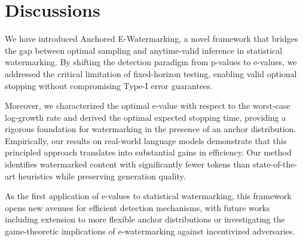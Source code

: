 \section{Discussions}

We have introduced Anchored E-Watermarking, a novel framework that bridges the gap between optimal sampling and anytime-valid inference in statistical watermarking. By shifting the detection paradigm from p-values to e-values, we addressed the critical limitation of fixed-horizon testing, enabling valid optional stopping without compromising Type-I error guarantees.

Moreover, we characterized the optimal e-value with respect to the worst-case log-growth rate and derived the optimal expected stopping time, providing a rigorous foundation for watermarking in the presence of an anchor distribution. Empirically, our results on real-world language models demonstrate that this principled approach translates into substantial gains in efficiency. Our method identifies watermarked content with significantly fewer tokens than state-of-the-art heuristics while preserving generation quality.

As the first application of e-values to statistical watermarking, this framework opens new avenues for efficient detection mechanisms, with future works including extension to more flexible anchor distributions or investigating the game-theoretic implications of e-watermarking against incentivized adversaries.

